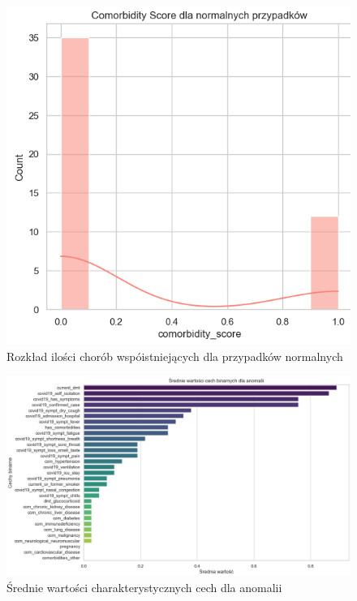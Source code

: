 \documentclass[a4paper,fleqn]{cas-dc}
\begin{document}
\begin{figure}[h]
	\includegraphics[scale=.73]{wykresy/wykres3.2.png}
	\caption{Rozkład ilości chorób wspóistniejących dla przypadków normalnych}
	\label{FIG:1}
\end{figure}

\begin{figure}[h]
	\includegraphics[scale=.35]{wykresy/wykres4.png}
	\caption{Średnie wartości charakterystycznych cech dla anomalii}
	\label{FIG:1}
\end{figure}
\end{document}
